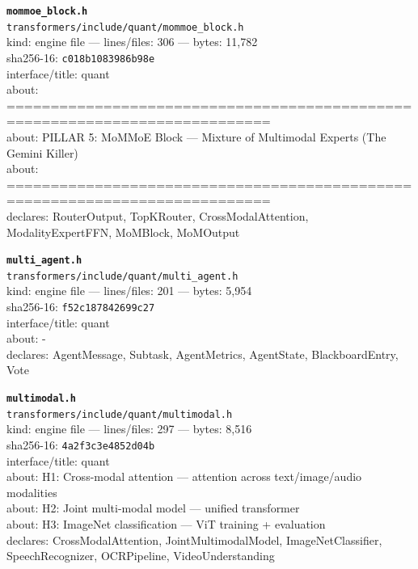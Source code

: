\noindent\textbf{\texttt{mommoe\_block.h}}\\
\texttt{transformers/include/quant/mommoe\_block.h}\\
kind: engine file --- lines/files: 306 --- bytes: 11,782\\
sha256-16: \texttt{c018b1083986b98e}\\
interface/title: quant\\
about: ============================================================================\\
about: PILLAR 5: MoMMoE Block — Mixture of Multimodal Experts (The Gemini Killer)\\
about: ============================================================================\\
declares: RouterOutput, TopKRouter, CrossModalAttention, ModalityExpertFFN, MoMBlock, MoMOutput\\
\vspace*{6.0pt}

\noindent\textbf{\texttt{multi\_agent.h}}\\
\texttt{transformers/include/quant/multi\_agent.h}\\
kind: engine file --- lines/files: 201 --- bytes: 5,954\\
sha256-16: \texttt{f52c187842699c27}\\
interface/title: quant\\
about: -\\
declares: AgentMessage, Subtask, AgentMetrics, AgentState, BlackboardEntry, Vote\\
\vspace*{6.0pt}

\noindent\textbf{\texttt{multimodal.h}}\\
\texttt{transformers/include/quant/multimodal.h}\\
kind: engine file --- lines/files: 297 --- bytes: 8,516\\
sha256-16: \texttt{4a2f3c3e4852d04b}\\
interface/title: quant\\
about: H1: Cross-modal attention — attention across text/image/audio modalities\\
about: H2: Joint multi-modal model — unified transformer\\
about: H3: ImageNet classification — ViT training + evaluation\\
declares: CrossModalAttention, JointMultimodalModel, ImageNetClassifier, SpeechRecognizer, OCRPipeline, VideoUnderstanding\\
\vspace*{6.0pt}

